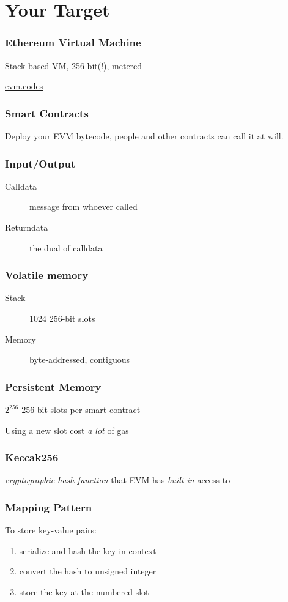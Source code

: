 \documentclass[aspectratio=169,17pt]{beamer}
\begin{document}
	\section{Your Target}
\begin{frame}
	\frametitle{Ethereum Virtual Machine}
	Stack-based VM, 256-bit(!), metered
	\bigskip

	\centering
	\url{evm.codes}
\end{frame}

\begin{frame}
	\frametitle{Smart Contracts}
	Deploy your EVM bytecode, people and other contracts can call it at will.
\end{frame}

\begin{frame}
	\frametitle{Input/Output}
	\begin{description}
		\item[Calldata] message from whoever called
		\item[Returndata] the dual of calldata
	\end{description}
\end{frame}

\begin{frame}
	\frametitle{Volatile memory}
	\begin{description}
		\item[Stack] 1024 256-bit slots
		\item[Memory] byte-addressed, contiguous
	\end{description}
\end{frame}

\begin{frame}
	\frametitle{Persistent Memory}
	$2^{256}$ 256-bit slots per smart contract

	Using a new slot cost \emph{a lot} of gas
\end{frame}

\begin{frame}
	\frametitle{Keccak256}
	\emph{cryptographic hash function}
	that EVM has \emph{built-in} access to
\end{frame}

\begin{frame}
	\frametitle{Mapping Pattern}
	To store key-value pairs:

	\begin{enumerate}
		\item serialize and hash the key in-context
		\item convert the hash to unsigned integer
		\item store the key at the numbered slot
	\end{enumerate}
\end{frame}
\end{document}
